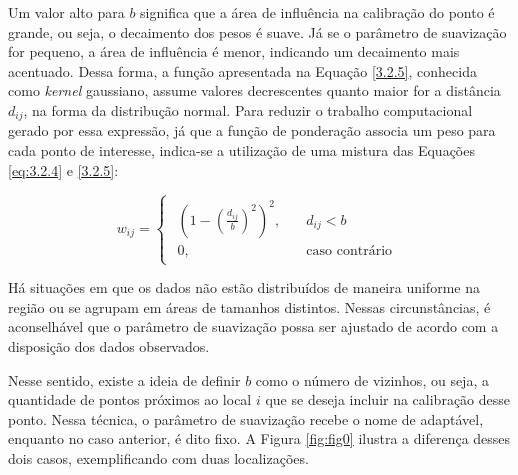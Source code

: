 \documentclass[12pt, a4paper, twoside]{report}
\numberwithin{equation}{section} %
\begin{document}
Um valor alto para $b$ significa que a área de influência na calibração do ponto é grande, ou seja, o decaimento dos pesos é suave. Já se o parâmetro de suavização for pequeno, a área de influência é menor, indicando um decaimento mais acentuado. Dessa forma, a função apresentada na Equação \eqref{3.2.5}, conhecida como \textit{kernel} gaussiano, assume valores decrescentes quanto maior for a distância $d_{ij}$, na forma da distribução normal. Para reduzir o trabalho computacional gerado por essa expressão, já que a função de ponderação associa um peso para cada ponto de interesse, indica-se a utilização de uma mistura das Equações \eqref{eq:3.2.4} e \eqref{3.2.5}:

\begin{equation}
w_{ij} =
\begin{cases}
  \begin{aligned}
    \left(1-\left(\frac{d_{ij}}{b}\right)^2\right)^2, & \quad d_{ij} < b \\
    0, & \quad \text{caso contrário}
  \end{aligned}
\end{cases}
\end{equation}

Há situações em que os dados não estão distribuídos de maneira uniforme na região ou se agrupam em áreas de tamanhos distintos. Nessas circunstâncias, é aconselhável que o parâmetro de suavização possa ser ajustado de acordo com a disposição dos dados observados.

Nesse sentido, existe a ideia de definir $b$ como o número de vizinhos, ou seja, a quantidade de pontos próximos ao local $i$ que se deseja incluir na calibração desse ponto. Nessa técnica, o parâmetro de suavização recebe o nome de adaptável, enquanto no caso anterior, é dito fixo. A Figura \ref{fig:fig0} ilustra a diferença desses dois casos, exemplificando com duas localizações.



\end{document}
